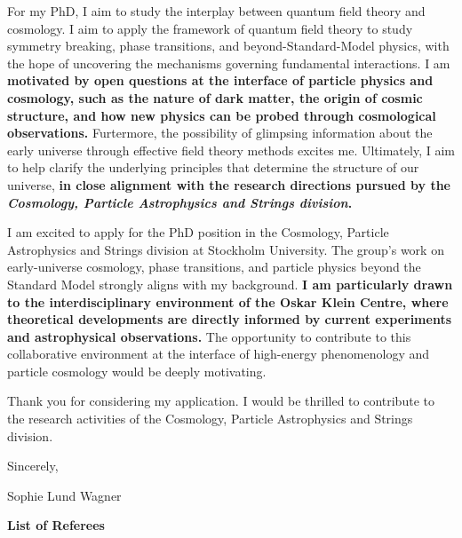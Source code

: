 \documentclass[a4paper,11pt]{letter}
\begin{document}
For my PhD, I aim to study the interplay between quantum field theory and cosmology. I aim to apply the framework of quantum field theory to study symmetry breaking, phase transitions, and beyond-Standard-Model physics, with the hope of uncovering the mechanisms governing fundamental interactions. I am
\textbf{motivated by open questions at the interface of particle physics and cosmology, such as the nature of dark matter, the origin of cosmic structure, and how new physics can be probed through cosmological observations.} Furtermore, the possibility of glimpsing information about the early universe through effective field theory methods excites me. Ultimately, I aim
to help clarify the underlying principles that determine the structure of our universe, \textbf{in close alignment with the research directions pursued by the \textit{Cosmology, Particle Astrophysics and Strings division}.} 

I am excited to apply for the PhD position in the Cosmology, Particle Astrophysics and Strings division at Stockholm University. The group’s work on early-universe cosmology, phase transitions, and particle physics beyond the Standard Model strongly aligns with my background. \textbf{I am particularly drawn to the interdisciplinary environment of the Oskar Klein Centre, where theoretical developments are directly informed by current experiments and astrophysical observations.} The opportunity to contribute to this collaborative environment at the interface of high-energy phenomenology and particle cosmology would be deeply motivating. 

Thank you for considering my application. I would be thrilled to contribute to the research activities of the Cosmology, Particle Astrophysics and Strings division.

Sincerely,

Sophie Lund Wagner 
\newpage
\vspace{5cm}
\begin{center}
    {\Large \textbf{List of Referees}} \\[1em]
\end{center}

\vspace{2em}
\end{document}
